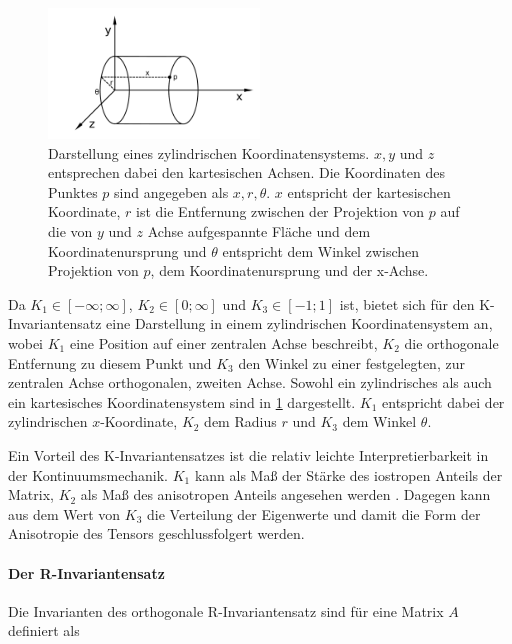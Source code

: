 \documentclass[a4paper,fontsize=12pt,toc=bib,parskip=half,ngerman]{scrartcl}
\begin{document}
\begin{figure}
	\centering
	\includegraphics[width=0.5\textwidth]{pictures/cylinder}
	\caption{Darstellung eines zylindrischen Koordinatensystems. $x,y$ und $z$ entsprechen dabei den kartesischen Achsen. Die Koordinaten des Punktes $p$ sind angegeben als $x, r, \theta$. $x$ entspricht der kartesischen Koordinate, $r$ ist die Entfernung zwischen der Projektion von $p$ auf die von $y$ und $z$ Achse aufgespannte Fl\"ache und dem Koordinatenursprung und $\theta$ entspricht dem Winkel zwischen Projektion von $p$, dem Koordinatenursprung und der x-Achse. }
	\label{cylinderCoords}
\end{figure}

Da $K_1 \in [-\infty; \infty]$, $K_2 \in [0;\infty]$ und $K_3 \in [-1;1]$ ist, bietet sich f\"ur den K-Invariantensatz eine Darstellung in einem zylindrischen Koordinatensystem an, wobei $K_1$ eine Position auf einer zentralen Achse beschreibt, $K_2$ die orthogonale Entfernung zu diesem Punkt und $K_3$ den Winkel zu einer festgelegten, zur zentralen Achse orthogonalen, zweiten Achse. Sowohl ein zylindrisches als auch ein kartesisches Koordinatensystem sind in \cref{cylinderCoords} dargestellt. $K_1$ entspricht dabei der zylindrischen $x$-Koordinate, $K_2$ dem Radius $r$ und $K_3$ dem Winkel $\theta$.

Ein Vorteil des K-Invariantensatzes ist die relativ leichte Interpretierbarkeit in der Kontinuumsmechanik. $K_1$ kann als Ma{\ss} der St\"arke des iostropen Anteils der Matrix, $K_2$ als Ma{\ss} des anisotropen Anteils angesehen werden \cite{kindlmann2007diffusion}. Dagegen kann aus dem Wert von $K_3$ die Verteilung der Eigenwerte und damit die Form der Anisotropie des Tensors geschlussfolgert werden.



\paragraph{Der R-Invariantensatz}
Die Invarianten des orthogonale R-Invariantensatz sind f\"ur eine Matrix $A$ definiert als
\end{document}
